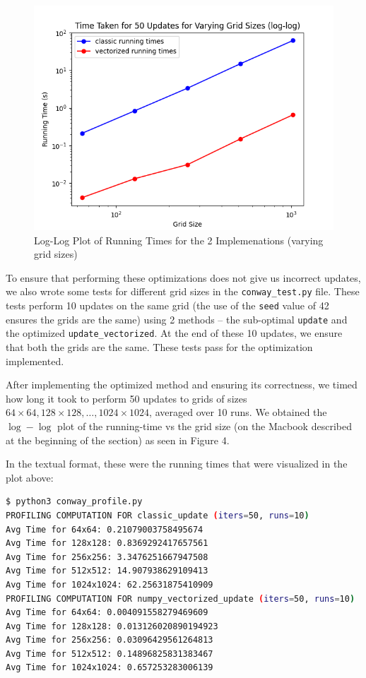 \documentclass[a4paper,12pt]{article}
\begin{document}
\begin{figure}[h!]
  \centering
  \includegraphics[width=\textwidth]{images/sub_v_vec_conway.png}
  \caption{Log-Log Plot of Running Times for the 2 Implemenations (varying grid sizes)}
  \label{fig:conway_docs}
\end{figure}

To ensure that performing these optimizations does not give us incorrect updates, we also wrote some tests for different grid sizes in the \verb|conway_test.py| file. These tests perform 10 updates on the same grid (the use of the \verb|seed| value of 42 ensures the grids are the same) using 2 methods -- the sub-optimal \verb|update| and the optimized \verb|update_vectorized|. At the end of these 10 updates, we ensure that both the grids are the same. These tests pass for the optimization implemented. 

After implementing the optimized method and ensuring its correctness, we timed how long it took to perform 50 updates to grids of sizes $64 \times 64, 128 \times 128, \dots, 1024 \times 1024$, averaged over 10 runs. We obtained the $\log - \log$ plot of the running-time vs the grid size (on the Macbook described at the beginning of the section) as seen in Figure 4.

In the textual format, these were the running times that were visualized in the plot above:

\begin{lstlisting}[language=bash,basicstyle=\scriptsize\ttfamily]
$ python3 conway_profile.py
PROFILING COMPUTATION FOR classic_update (iters=50, runs=10)
Avg Time for 64x64: 0.21079003758495674
Avg Time for 128x128: 0.8369292417657561
Avg Time for 256x256: 3.3476251667947508
Avg Time for 512x512: 14.907938629109413
Avg Time for 1024x1024: 62.25631875410909
PROFILING COMPUTATION FOR numpy_vectorized_update (iters=50, runs=10)
Avg Time for 64x64: 0.004091558279469609
Avg Time for 128x128: 0.013126020890194923
Avg Time for 256x256: 0.03096429561264813
Avg Time for 512x512: 0.14896825831383467
Avg Time for 1024x1024: 0.657253283006139
\end{lstlisting}
\end{document}
